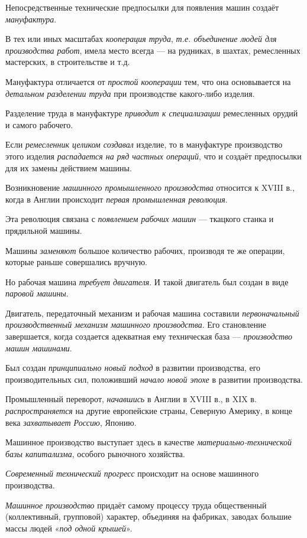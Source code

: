 \documentclass[a4paper,14pt,russian]{extreport}
\begin{document}
Непосредственные технические предпосылки для появления машин создаёт \emph{мануфактура}.

В тех или иных масштабах \emph{кооперация труда}, \emph{т.е. объединение людей для производства работ}, имела место всегда --- на рудниках, в шахтах, ремесленных мастерских, в строительстве и т.д.

Мануфактура отличается от \emph{простой кооперации} тем, что она основывается на \emph{детальном разделении труда} при производстве какого-либо изделия.

Разделение труда в мануфактуре \emph{приводит к специализации} ремесленных орудий и самого рабочего.

Если \emph{ремесленник целиком создавал} изделие, то в мануфактуре производство этого изделия \emph{распадается на ряд частных операций}, что и создаёт предпосылки для их замены действием машины.

Возникновение \emph{машинного промышленного производства} относится к XVIII в., когда в Англии происходит \emph{первая промышленная революция}.

Эта революция связана с \emph{появлением рабочих машин} --- ткацкого станка и прядильной машины.

Машины \emph{заменяют} большое количество рабочих, производя те же операции, которые раньше совершались вручную.

Но рабочая машина \emph{требует двигателя}. И такой двигатель был создан в виде \emph{паровой машины}.

Двигатель, передаточный механизм и рабочая машина составили \emph{первоначальный производственный механизм машинного производства}. Его становление завершается, когда создается адекватная ему техническая база --- \emph{производство машин машинами}.

Был создан \emph{принципиально новый подход} в развитии производства, его производительных сил, положивший \emph{начало новой эпохе} в развитии производства.

Промышленный переворот, \emph{начавшись} в Англии в XVIII в., в XIX в. \emph{распространяется} на другие европейские страны, Северную Америку, в конце века \emph{захватывает Россию}, Японию.

Машинное производство выступает здесь в качестве \emph{материально-технической базы капитализма}, особого рыночного хозяйства.

\emph{Современный технический прогресс} происходит на основе машинного производства.

\emph{Машинное производство} придаёт самому процессу труда общественный (коллективный, групповой) характер, объединяя на фабриках, заводах большие массы людей «\emph{под одной крышей}».
\end{document}
